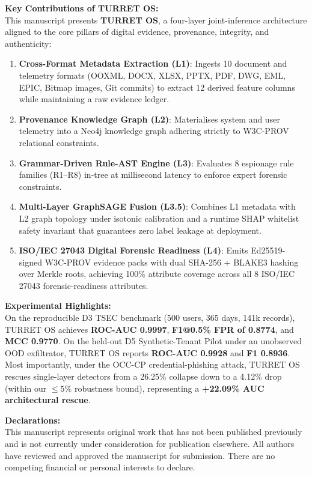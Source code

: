 \documentclass[11pt,a4paper]{article}
\begin{document}
\textbf{Key Contributions of TURRET OS:} \\
This manuscript presents \textbf{TURRET OS}, a four-layer joint-inference architecture aligned to the core pillars of digital evidence, provenance, integrity, and authenticity:
\begin{enumerate}[leftmargin=*,itemsep=0.4em]
    \item \textbf{Cross-Format Metadata Extraction (L1)}: Ingests 10 document and telemetry formats (OOXML, DOCX, XLSX, PPTX, PDF, DWG, EML, EPIC, Bitmap images, Git commits) to extract 12 derived feature columns while maintaining a raw evidence ledger.
    \item \textbf{Provenance Knowledge Graph (L2)}: Materialises system and user telemetry into a Neo4j knowledge graph adhering strictly to W3C-PROV relational constraints.
    \item \textbf{Grammar-Driven Rule-AST Engine (L3)}: Evaluates 8 espionage rule families (R1--R8) in-tree at millisecond latency to enforce expert forensic constraints.
    \item \textbf{Multi-Layer GraphSAGE Fusion (L3.5)}: Combines L1 metadata with L2 graph topology under isotonic calibration and a runtime SHAP whitelist safety invariant that guarantees zero label leakage at deployment.
    \item \textbf{ISO/IEC 27043 Digital Forensic Readiness (L4)}: Emits Ed25519-signed W3C-PROV evidence packs with dual SHA-256 + BLAKE3 hashing over Merkle roots, achieving 100\% attribute coverage across all 8 ISO/IEC 27043 forensic-readiness attributes.
\end{enumerate}

\textbf{Experimental Highlights:} \\
On the reproducible D3 TSEC benchmark (500 users, 365 days, 141k records), TURRET OS achieves \textbf{ROC-AUC 0.9997}, \textbf{F1@0.5\% FPR of 0.8774}, and \textbf{MCC 0.9770}. On the held-out D5 Synthetic-Tenant Pilot under an unobserved OOD exfiltrator, TURRET OS reports \textbf{ROC-AUC 0.9928} and \textbf{F1 0.8936}. Most importantly, under the OCC-CP credential-phishing attack, TURRET OS rescues single-layer detectors from a 26.25\% collapse down to a 4.12\% drop (within our $\le 5\%$ robustness bound), representing a \textbf{+22.09\% AUC architectural rescue}.

\textbf{Declarations:} \\
This manuscript represents original work that has not been published previously and is not currently under consideration for publication elsewhere. All authors have reviewed and approved the manuscript for submission. There are no competing financial or personal interests to declare.
\end{document}
